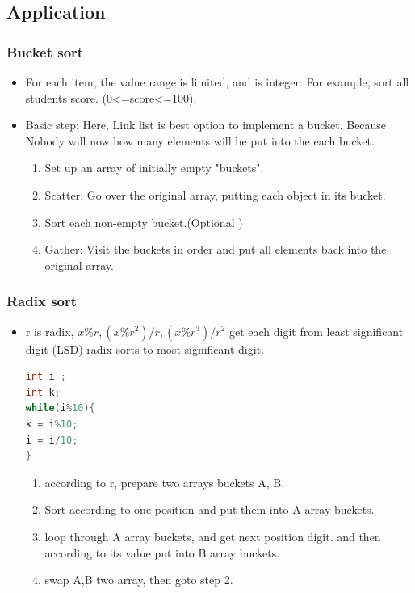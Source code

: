 \documentclass[a4paper,12pt,twoside]{book}
\begin{document}
\subsection{Application}
\subsubsection{Bucket sort}

\begin{itemize}
\item For each item, the value range is limited, and is integer. For example, sort all students score. (0<=score<=100). 
\item Basic step:  Here, Link list is best option to implement a bucket. Because Nobody will now how many elements will be put into the each bucket. 
\begin{enumerate}
\item Set up an array of initially empty "buckets".
\item Scatter: Go over the original array, putting each object in its bucket. 
\item Sort each non-empty bucket.(Optional )
\item Gather: Visit the buckets in order and put all elements back into the original array.
\end{enumerate}

\end{itemize}

\subsubsection{Radix sort}

\begin{itemize}
\item r is radix, $x\%r, (x\%r^{2})/r, (x\%r^{3})/r^{2}$  get each digit from least significant digit (LSD) radix sorts to most significant digit. 

\begin{lstlisting}[frame=single, language=c++]
int i ;
int k;
while(i%10){
k = i%10;
i = i/10;
}
\end{lstlisting}


\begin{enumerate}
\item according to r, prepare two arrays buckets A, B. 
\item Sort according to one position and put them into A array buckets. 
\item loop through A array buckets, and get next position digit. and then according to its value put into B array buckets.
\item swap A,B two array, then goto step 2.
\end{enumerate}

\end{itemize}
\end{document}

